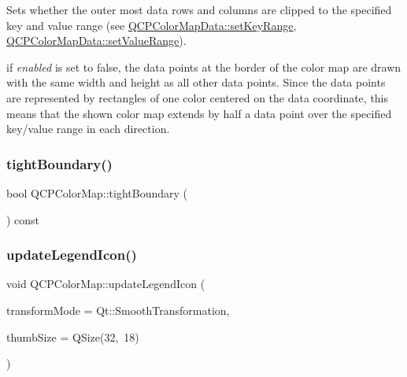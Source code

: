 Sets whether the outer most data rows and columns are clipped to the specified key and value range (see \mbox{\hyperlink{class_q_c_p_color_map_data_a0738c485f3c9df9ea1241b7a8bb6a86e}{Q\+C\+P\+Color\+Map\+Data\+::set\+Key\+Range}}, \mbox{\hyperlink{class_q_c_p_color_map_data_ada1b2680ba96a5f4175b6d341cf75d23}{Q\+C\+P\+Color\+Map\+Data\+::set\+Value\+Range}}).

if {\itshape enabled} is set to false, the data points at the border of the color map are drawn with the same width and height as all other data points. Since the data points are represented by rectangles of one color centered on the data coordinate, this means that the shown color map extends by half a data point over the specified key/value range in each direction.

\mbox{\label{class_q_c_p_color_map_a53b5d26b28d6027af0fc863f057965db}} 
\subsubsection{\texorpdfstring{tightBoundary()}{tightBoundary()}}
{\footnotesize\ttfamily bool Q\+C\+P\+Color\+Map\+::tight\+Boundary (\begin{DoxyParamCaption}{ }\end{DoxyParamCaption}) const\hspace{0.3cm}{\ttfamily [inline]}}

\mbox{\label{class_q_c_p_color_map_a5d8158b62d55fcfeaabcb68ce0083e87}} 
\subsubsection{\texorpdfstring{updateLegendIcon()}{updateLegendIcon()}}
{\footnotesize\ttfamily void Q\+C\+P\+Color\+Map\+::update\+Legend\+Icon (\begin{DoxyParamCaption}\item[{Qt\+::\+Transformation\+Mode}]{transform\+Mode = {\ttfamily Qt\+:\+:SmoothTransformation},  }\item[{const Q\+Size \&}]{thumb\+Size = {\ttfamily QSize(32,~18)} }\end{DoxyParamCaption})}

